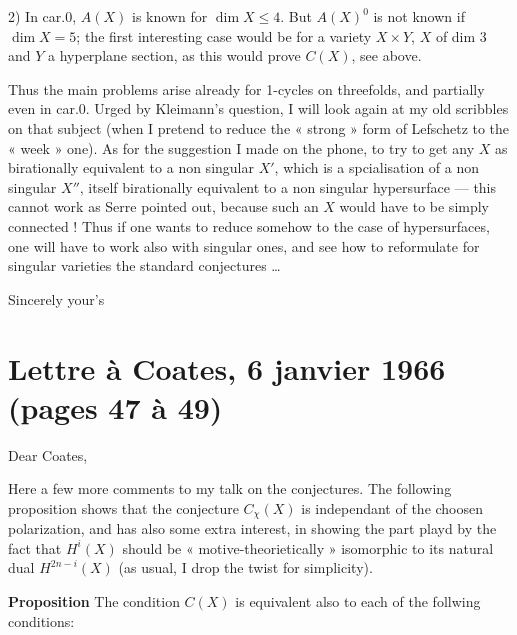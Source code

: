 \documentclass[11pt,a4paper]{article}
\begin{document}
2) In car.$0$, $A(X)$ is known for $\dim X \leq 4$. But $A(X)^{0}$ is not known
if $\dim X = 5$; the first interesting case would be for a variety
$X \times Y$, $X$ of dim 3 and $Y$ a hyperplane section, as this would prove
$C(X)$, see above.

Thus the main problems arise already for 1-cycles on threefolds, and partially
even in car.$0$. Urged by Kleimann's question, I will look again at my old
scribbles on that subject (when I pretend to reduce the « strong » form of
Lefschetz to the « week » one). As for the suggestion I made on the phone, to
try to get any $X$ as birationally equivalent to a non singular $X'$, which is a
spcialisation of a non singular $X''$, itself birationally equivalent to a non
singular hypersurface --- this cannot work as Serre pointed out, because such an
$X$ would have to be simply connected ! Thus if one wants to reduce somehow to
the case of hypersurfaces, one will have to work also with singular ones, and
see how to reformulate for singular varieties the standard conjectures …

Sincerely your's

\section*{Lettre à Coates, 6 janvier 1966 (pages 47 à 49)}



Dear Coates,

Here a few more comments to my talk on the conjectures. The following
proposition shows that the conjecture $C_{\chi}(X)$ is independant of the
choosen polarization, and has also some extra interest, in showing the part
playd by the fact that $H^{i}(X)$ should be « motive-theorietically »
isomorphic to its natural dual $H^{2n-i}(X)$ (as usual, I drop the twist for
simplicity).

\textbf{Proposition} The condition $C(X)$ is equivalent also to each of the
follwing conditions:
\end{document}
